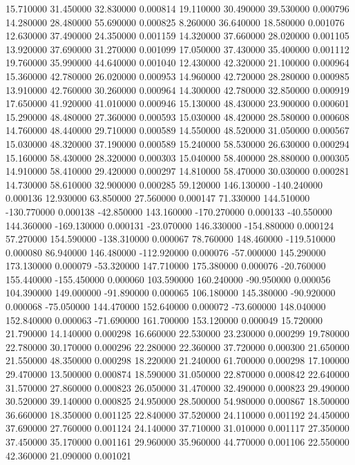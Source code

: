 15.710000 31.450000 32.830000 0.000814 
19.110000 30.490000 39.530000 0.000796 
14.280000 28.480000 55.690000 0.000825 
8.260000 36.640000 18.580000 0.001076 
12.630000 37.490000 24.350000 0.001159 
14.320000 37.660000 28.020000 0.001105 
13.920000 37.690000 31.270000 0.001099 
17.050000 37.430000 35.400000 0.001112 
19.760000 35.990000 44.640000 0.001040 
12.430000 42.320000 21.100000 0.000964 
15.360000 42.780000 26.020000 0.000953 
14.960000 42.720000 28.280000 0.000985 
13.910000 42.760000 30.260000 0.000964 
14.300000 42.780000 32.850000 0.000919 
17.650000 41.920000 41.010000 0.000946 
15.130000 48.430000 23.900000 0.000601 
15.290000 48.480000 27.360000 0.000593 
15.030000 48.420000 28.580000 0.000608 
14.760000 48.440000 29.710000 0.000589 
14.550000 48.520000 31.050000 0.000567 
15.030000 48.320000 37.190000 0.000589 
15.240000 58.530000 26.630000 0.000294 
15.160000 58.430000 28.320000 0.000303 
15.040000 58.400000 28.880000 0.000305 
14.910000 58.410000 29.420000 0.000297 
14.810000 58.470000 30.030000 0.000281 
14.730000 58.610000 32.900000 0.000285 
59.120000 146.130000 -140.240000 0.000136 
12.930000 63.850000 27.560000 0.000147 
71.330000 144.510000 -130.770000 0.000138 
-42.850000 143.160000 -170.270000 0.000133 
-40.550000 144.360000 -169.130000 0.000131 
-23.070000 146.330000 -154.880000 0.000124 
57.270000 154.590000 -138.310000 0.000067 
78.760000 148.460000 -119.510000 0.000080 
86.940000 146.480000 -112.920000 0.000076 
-57.000000 145.290000 173.130000 0.000079 
-53.320000 147.710000 175.380000 0.000076 
-20.760000 155.440000 -155.450000 0.000060 
103.590000 160.240000 -90.950000 0.000056 
104.390000 149.000000 -91.890000 0.000065 
106.180000 145.380000 -90.920000 0.000068 
-75.050000 144.470000 152.640000 0.000072 
-73.600000 148.040000 152.840000 0.000063 
-71.690000 161.700000 153.120000 0.000049 
15.720000 21.790000 14.140000 0.000298 
16.660000 22.530000 23.230000 0.000299 
19.780000 22.780000 30.170000 0.000296 
22.280000 22.360000 37.720000 0.000300 
21.650000 21.550000 48.350000 0.000298 
18.220000 21.240000 61.700000 0.000298 
17.100000 29.470000 13.500000 0.000874 
18.590000 31.050000 22.870000 0.000842 
22.640000 31.570000 27.860000 0.000823 
26.050000 31.470000 32.490000 0.000823 
29.490000 30.520000 39.140000 0.000825 
24.950000 28.500000 54.980000 0.000867 
18.500000 36.660000 18.350000 0.001125 
22.840000 37.520000 24.110000 0.001192 
24.450000 37.690000 27.760000 0.001124 
24.140000 37.710000 31.010000 0.001117 
27.350000 37.450000 35.170000 0.001161 
29.960000 35.960000 44.770000 0.001106 
22.550000 42.360000 21.090000 0.001021 
